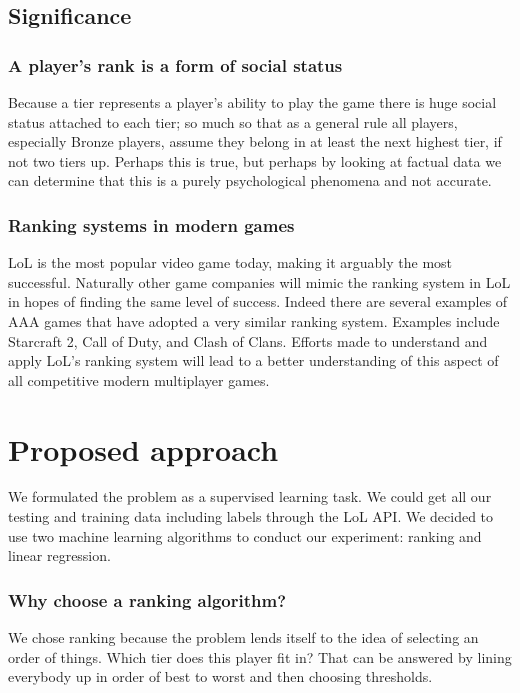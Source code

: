 \documentclass{article} %
\begin{document}
\subsection{Significance}

\subsubsection{A player's rank is a form of social status}
Because a tier represents a player's ability to play the game there is huge social status attached to each tier; so much so that as a general rule all players, especially Bronze players, assume they belong in at least the next highest tier, if not two tiers up. Perhaps this is true, but perhaps by looking at factual data we can determine that this is a purely psychological phenomena and not accurate.

\subsubsection{Ranking systems in modern games}
LoL is the most popular video game today, making it arguably the most successful. Naturally other game companies will mimic the ranking system in LoL in hopes of finding the same level of success. Indeed there are several examples of AAA games that have adopted a very similar ranking system. Examples include Starcraft 2, Call of Duty, and Clash of Clans. Efforts made to understand and apply LoL's ranking system will lead to a better understanding of this aspect of all competitive modern multiplayer games.


\section{Proposed approach}
We formulated the problem as a supervised learning task. We could get all our testing and training data including labels through the LoL API. We decided to use two machine learning algorithms to conduct our experiment: ranking and linear regression.

\subsubsection{Why choose a ranking algorithm?}
We chose ranking because the problem lends itself to the idea of selecting an order of things. Which tier does this player fit in? That can be answered by lining everybody up in order of best to worst and then choosing thresholds.
\end{document}
